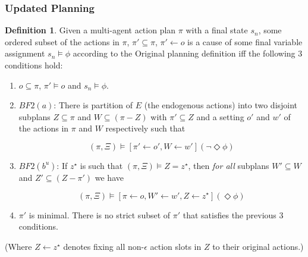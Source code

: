 \documentclass{article}
\theoremstyle{plain}
\theoremstyle{definition}
\newtheorem{defn}[thm]{Definition} %
\begin{document}
\subsubsection*{Updated Planning}
\begin{defn}
Given a multi-agent action plan $\pi$ with a final state $s_n$, some ordered subset of the actions in $\pi$, $\pi' \subseteq \pi$, $\pi' \leftarrow o$ is a cause of some final variable assignment $s_n \models \phi$ according to the Original planning definition iff the following 3 conditions hold:
\begin{enumerate}
\item  $o \subseteq \pi$, $\pi' \models o$ and $s_n \models \phi$.



\item $BF2(a)$: There is partition of $E$ (the endogenous actions) into two disjoint subplans $Z \subseteq \pi$ and $W \subseteq (\pi - Z)$ with $\pi' \subseteq Z$ and a setting $o'$ and $w'$ of the actions in $\pi$ and $W$ respectively such that

\[
(\pi, \Xi) \models [\pi' \leftarrow o', W \leftarrow w'](\lnot \Diamond \phi)
\]

\item $BF2(b^u)$: If $z^\star$ is such that $(\pi, \Xi) \models Z = z^\star$, then \textit{for all} subplans $W' \subseteq W$ and $Z' \subseteq (Z - \pi')$ we have

\[
(\pi, \Xi) \models [\pi \leftarrow o, W' \leftarrow w', Z \leftarrow z^\star](\Diamond \phi)
\]

\item $\pi'$ is minimal. There is no strict subset of $\pi'$ that satisfies the previous 3 conditions.
\end{enumerate}
\end{defn}

(Where $Z\leftarrow z^\star$ denotes fixing all non-$\epsilon$ action slots in $Z$ to their original actions.)
\end{document}
